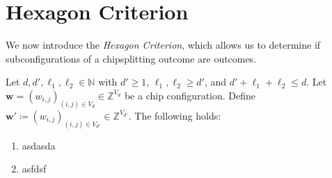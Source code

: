 \chapter{Hexagon Criterion}

We now introduce the \emph{Hexagon Criterion}, which allows us to determine if subconfigurations of a chipsplitting outcome are outcomes.

\begin{proposition}
    Let \( d, d', \ell_1, \ell_2 \in \mathbb{N} \) with \( d' \geq 1 \), \( \ell_1, \ell_2 \geq d' \), and \( d' + \ell_1 + \ell_2 \leq d \). Let \( \mathbf{w} = (w_{i,j})_{(i,j) \in V_d} \in \mathbb{Z}^{V_d} \) be a chip configuration. Define \( \mathbf{w}' \coloneqq (w_{i,j})_{(i,j) \in V_{d'}} \in \mathbb{Z}^{V_{d'}}\). The following holds:
    \begin{enumerate}
        \item asdasda
        \item asfdsf
    \end{enumerate}
\end{proposition}